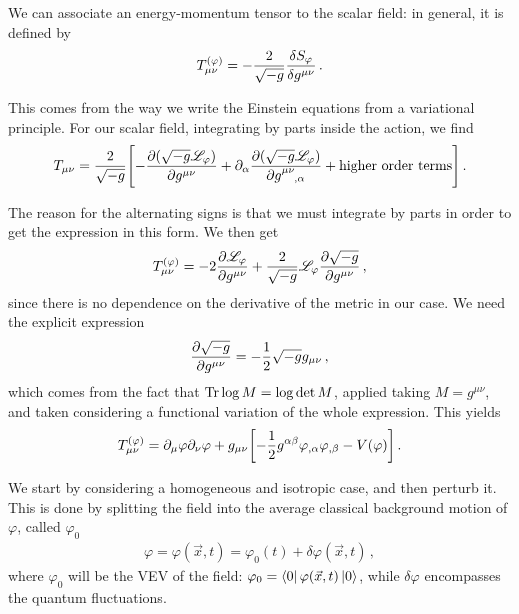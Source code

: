 \documentclass[main.tex]{subfiles}
\begin{document}
We can associate an energy-momentum tensor to the scalar field: in general, it is defined by 
%
\begin{align}
T_{\mu \nu }^{(\varphi )} = - \frac{2}{\sqrt{-g}} \fdv{S_{\varphi }}{g^{\mu \nu }}
\,.
\end{align}

This comes from the way we write the Einstein equations from a variational principle. 
For our scalar field, integrating by parts inside the action, we find 
%
\begin{align}
T_{\mu \nu } = \frac{2}{\sqrt{-g}} \qty[
    -\pdv{(\sqrt{-g} \mathscr{L}_\varphi )}{g^{\mu \nu }}
    +
    \partial_{\alpha }
    \pdv{(\sqrt{-g} \mathscr{L}_\varphi )}{\tensor{g}{^{\mu \nu }_{,\alpha }}} 
    + \text{higher order terms}
]
\,.
\end{align}


The reason for the alternating signs is that we must integrate by parts in order to get the expression in this form. 
We then get 
%
\begin{align}
T^{(\varphi )}_{\mu \nu } = 
- 2 \frac{\partial\mathscr{L}_\varphi }{\partial g^{\mu \nu }} + \frac{2}{\sqrt{-g}} \mathscr{L}_\varphi \pdv{\sqrt{-g}}{g^{\mu \nu }}
\,,
\end{align}
%
since there is no dependence on the derivative of the metric in our case. We need the explicit expression 
%
\begin{align}
\pdv{\sqrt{-g}}{g^{\mu \nu }} = - \frac{1}{2} \sqrt{-g} g_{\mu \nu }
\,,
\end{align}
%
which comes from the fact that \(\Tr \log M = \log \det M\), applied taking \(M = g^{\mu \nu }\), and taken considering a functional variation of the whole expression. 
This yields 
%
\begin{align}
T^{(\varphi )}_{\mu \nu } = \partial_{\mu } \varphi \partial_{\nu } \varphi 
+ g_{\mu \nu } \qty[- \frac{1}{2} g^{\alpha \beta } \varphi_{, \alpha } \varphi_{, \beta } - V(\varphi )] 
\,.
\end{align}

We start by considering a homogeneous and isotropic case, and then perturb it. This is done by splitting the field into the average classical background motion of \(\varphi \), called \(\varphi_0 \) 
%
\begin{align}
\varphi = \varphi (\vec{x}, t) = \varphi_0 (t) + \delta \varphi (\vec{x}, t)
\,,
\end{align}
%
where \(\varphi_0 \) will be the VEV of the field: \(\varphi_0 = \bra{0} \varphi (\vec{x}, t) \ket{0}\), while \(\delta \varphi \) encompasses the quantum fluctuations. 
\end{document}
